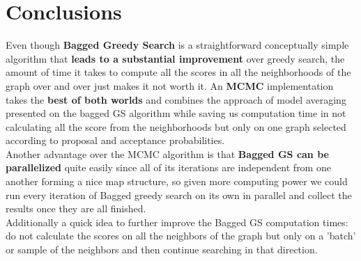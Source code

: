 \documentclass{article}
\begin{document}
	\section{Conclusions}
	Even though \textbf{Bagged Greedy Search} is a straightforward conceptually simple
	algorithm that \textbf{leads to a substantial improvement} over greedy search,
	the amount of time it takes to compute all the scores in all the neighborhoods 
	of the graph over and over just makes it not worth it. An \textbf{MCMC} implementation 
	takes the \textbf{best of both worlds} and combines the approach of model averaging 
	presented on the bagged GS algorithm while saving us
	computation time in not calculating all the score from the neighborhoods but 
	only on one graph selected according to proposal and acceptance probabilities. 
	\\
	Another advantage over the MCMC algorithm is that \textbf{Bagged GS can be
	parallelized} quite easily since all of its iterations are independent from
	one another forming a nice map structure, so given more computing power we
	could run every iteration of Bagged greedy search on its own in parallel and
	collect the results once they are all finished.
	\\
	Additionally a quick idea to further improve the Bagged GS computation times: do not
	calculate the scores on all the neighbors of the graph but only on a
	'batch' or sample of the neighbors and then continue searching in that
	direction. \\
\end{document}
